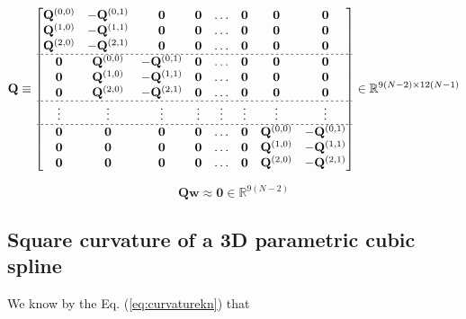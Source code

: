 \begin{equation}\label{eq:Qmat}
\mathbf{Q}
\equiv
\begin{bmatrix}
\mathbf{Q}^{(0,0)} & -\mathbf{Q}^{(0,1)} & \mathbf{0} & \mathbf{0} & \hdots & \mathbf{0} & \mathbf{0} & \mathbf{0}\\
\mathbf{Q}^{(1,0)} & -\mathbf{Q}^{(1,1)} & \mathbf{0} & \mathbf{0} & \hdots & \mathbf{0} & \mathbf{0} & \mathbf{0}\\
\mathbf{Q}^{(2,0)} & -\mathbf{Q}^{(2,1)} & \mathbf{0} & \mathbf{0} & \hdots & \mathbf{0} & \mathbf{0} & \mathbf{0}\\ \hdashline[2pt/2pt]
\mathbf{0} & \mathbf{Q}^{(0,0)} & -\mathbf{Q}^{(0,1)} & \mathbf{0} & \hdots & \mathbf{0} & \mathbf{0} & \mathbf{0}\\
\mathbf{0} & \mathbf{Q}^{(1,0)} & -\mathbf{Q}^{(1,1)} & \mathbf{0} & \hdots & \mathbf{0} & \mathbf{0} & \mathbf{0}\\
\mathbf{0} & \mathbf{Q}^{(2,0)} & -\mathbf{Q}^{(2,1)} & \mathbf{0} & \hdots & \mathbf{0} & \mathbf{0} & \mathbf{0}\\ \hdashline[2pt/2pt]
\vdots     & \vdots             & \vdots             & \vdots     & \vdots & \vdots     & \vdots     & \vdots    \\ \hdashline[2pt/2pt]
\mathbf{0} & \mathbf{0}         & \mathbf{0}         & \mathbf{0} & \hdots & \mathbf{0} & \mathbf{Q}^{(0,0)} & -\mathbf{Q}^{(0,1)}\\
\mathbf{0} & \mathbf{0}         & \mathbf{0}         & \mathbf{0} & \hdots & \mathbf{0} & \mathbf{Q}^{(1,0)} & -\mathbf{Q}^{(1,1)}\\
\mathbf{0} & \mathbf{0}         & \mathbf{0}         & \mathbf{0} & \hdots & \mathbf{0} & \mathbf{Q}^{(2,0)} & -\mathbf{Q}^{(2,1)}\\
\end{bmatrix}
\in \mathbb{R}^{9(N-2)\times 12(N-1)}
\end{equation}

\begin{equation}
\mathbf{Q}
\mathbf{w}
\approx\mathbf{0}\in \mathbb{R}^{9(N-2)}
\end{equation}



\subsection{Square curvature of a 3D parametric cubic spline}
\label{sec:curvaturemain}
We know by the Eq. (\ref{eq:curvaturekn}) that

